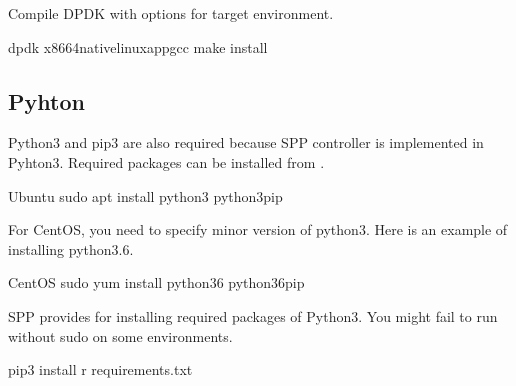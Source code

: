 \documentclass[a4paper,11pt,openany,oneside,english]{sphinxmanual}
\begin{document}
Compile DPDK with options for target environment.

\begin{sphinxVerbatim}[commandchars=\\\{\},formatcom=\footnotesize]
  dpdk
  
  x86\PYGZus{}64\PYGZhy{}native\PYGZhy{}linuxapp\PYGZhy{}gcc  
 make install 
\end{sphinxVerbatim}


\subsection{Pyhton}
\label{\detokenize{gsg/install:pyhton}}
Python3 and pip3 are also required because SPP controller is implemented
in Pyhton3. Required packages can be installed from .

\begin{sphinxVerbatim}[commandchars=\\\{\},formatcom=\footnotesize]
 Ubuntu
 sudo apt install python3 
  python3\PYGZhy{}pip
\end{sphinxVerbatim}

For CentOS, you need to specify minor version of python3.
Here is an example of installing python3.6.

\begin{sphinxVerbatim}[commandchars=\\\{\},formatcom=\footnotesize]
 CentOS
 sudo yum install python36 
  python36\PYGZhy{}pip
\end{sphinxVerbatim}

SPP provides  for installing required packages of Python3.
You might fail to run  without sudo on some environments.

\begin{sphinxVerbatim}[commandchars=\\\{\},formatcom=\footnotesize]
 pip3 install \PYGZhy{}r requirements.txt
\end{sphinxVerbatim}
\end{document}
